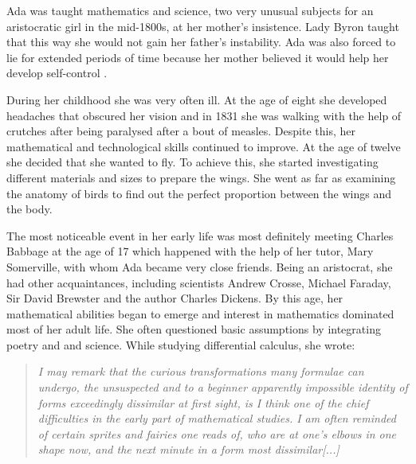 \documentclass{article}
\begin{document}
\vspace{0.3cm}

Ada was taught mathematics and science, two very unusual subjects for an aristocratic girl in the mid-1800s, at her mother's insistence. Lady Byron taught that this way she would not gain her father's instability. Ada was also forced to lie for extended periods of time because her mother believed it would help her develop self-control \cite{biographydotcom}.

\vspace{0.3cm}

During her childhood she was very often ill. At the age of eight she developed headaches that obscured her vision and in 1831 she was walking with the help of crutches after being paralysed after a bout of measles. Despite this, her mathematical and technological skills continued to improve. At the age of twelve she decided that she wanted to fly. To achieve this, she started investigating different materials and sizes to prepare the wings. She went as far as examining the anatomy of birds to find out the perfect proportion between the wings and the body.

\vspace{0.3cm}

The most noticeable event in her early life was most definitely meeting Charles Babbage at the age of 17 which happened with the help of her tutor, Mary Somerville, with whom Ada became very close friends. Being an aristocrat, she had other acquaintances, including scientists Andrew Crosse, Michael Faraday, Sir David Brewster and the author Charles Dickens. By this age, her mathematical abilities began to emerge and interest in mathematics dominated most of her adult life. She often questioned basic assumptions by integrating poetry and and science. While studying differential calculus, she wrote: \cite{Wikipedia}
\vspace{0.3cm}
\begin{quote}
    \textit{
        I may remark that the curious transformations many formulae can undergo, the unsuspected and to a beginner apparently impossible identity of forms exceedingly dissimilar at first sight, is I think one of the chief difficulties in the early part of mathematical studies. I am often reminded of certain sprites and fairies one reads of, who are at one's elbows in one shape now, and the next minute in a form most dissimilar[...]
}
\end{quote}
\vspace*{\fill}
\end{document}
